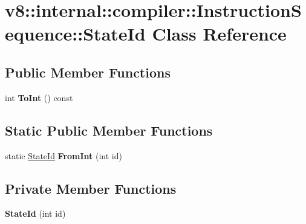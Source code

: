 \hypertarget{classv8_1_1internal_1_1compiler_1_1_instruction_sequence_1_1_state_id}{}\section{v8\+:\+:internal\+:\+:compiler\+:\+:Instruction\+Sequence\+:\+:State\+Id Class Reference}
\label{classv8_1_1internal_1_1compiler_1_1_instruction_sequence_1_1_state_id}
\subsection*{Public Member Functions}
\begin{DoxyCompactItemize}
\item 
int {\bfseries To\+Int} () const \hypertarget{classv8_1_1internal_1_1compiler_1_1_instruction_sequence_1_1_state_id_a1d98645dae193f8dfa9c0c5a51d511bb}{}\label{classv8_1_1internal_1_1compiler_1_1_instruction_sequence_1_1_state_id_a1d98645dae193f8dfa9c0c5a51d511bb}

\end{DoxyCompactItemize}
\subsection*{Static Public Member Functions}
\begin{DoxyCompactItemize}
\item 
static \hyperlink{classv8_1_1internal_1_1compiler_1_1_instruction_sequence_1_1_state_id}{State\+Id} {\bfseries From\+Int} (int id)\hypertarget{classv8_1_1internal_1_1compiler_1_1_instruction_sequence_1_1_state_id_ad771b4c03fdc783eb8ac03b76dced822}{}\label{classv8_1_1internal_1_1compiler_1_1_instruction_sequence_1_1_state_id_ad771b4c03fdc783eb8ac03b76dced822}

\end{DoxyCompactItemize}
\subsection*{Private Member Functions}
\begin{DoxyCompactItemize}
\item 
{\bfseries State\+Id} (int id)\hypertarget{classv8_1_1internal_1_1compiler_1_1_instruction_sequence_1_1_state_id_a393a8b1242f0770032d108538ec2591a}{}\label{classv8_1_1internal_1_1compiler_1_1_instruction_sequence_1_1_state_id_a393a8b1242f0770032d108538ec2591a}

\end{DoxyCompactItemize}
